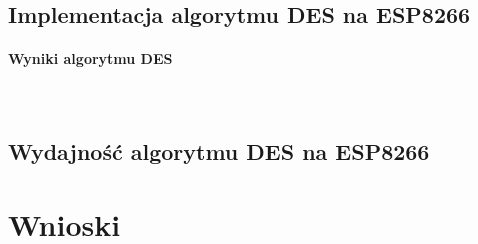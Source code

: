 \documentclass[12p]{article}
\begin{document}
\subsection{Implementacja algorytmu DES na ESP8266}



\paragraph{Wyniki algorytmu DES}\mbox{} \\


\subsection{Wydajność algorytmu DES na ESP8266} 
\newpage
\section{Wnioski}
\end{document}
